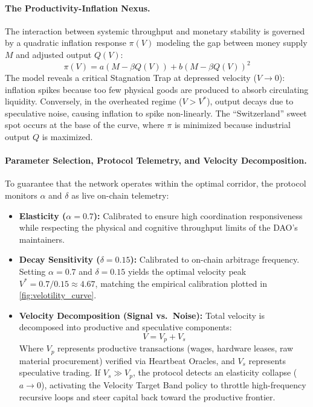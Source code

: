 \documentclass[a4paper,11pt,twoside,parskip=half-,headings=small]{scrartcl}
\begin{document}
\paragraph{The Productivity-Inflation Nexus.}
The interaction between systemic throughput and monetary stability is governed by a quadratic inflation response $\pi(V)$ modeling the gap between money supply $M$ and adjusted output $Q(V)$:
\begin{equation}
  \pi(V) = a \left( M - \beta Q(V) \right) + b \left( M - \beta Q(V) \right)^2
  \label{eq:inflation_nexus}
\end{equation}
The model reveals a critical Stagnation Trap at depressed velocity ($V \to 0$): inflation spikes because too few physical goods are produced to absorb circulating liquidity. Conversely, in the overheated regime ($V > V^*$), output decays due to speculative noise, causing inflation to spike non-linearly. The ``Switzerland'' sweet spot occurs at the base of the curve, where $\pi$ is minimized because industrial output $Q$ is maximized.

\paragraph{Parameter Selection, Protocol Telemetry, and Velocity Decomposition.}
To guarantee that the network operates within the optimal corridor, the protocol monitors $\alpha$ and $\delta$ as live on-chain telemetry:
\begin{itemize}[nosep]
  \item \textbf{Elasticity ($\alpha = 0.7$):} Calibrated to ensure high coordination responsiveness while respecting the physical and cognitive throughput limits of the DAO's maintainers.
  \item \textbf{Decay Sensitivity ($\delta = 0.15$):} Calibrated to on-chain arbitrage frequency. Setting $\alpha = 0.7$ and $\delta = 0.15$ yields the optimal velocity peak $V^* = 0.7 / 0.15 \approx 4.67$, matching the empirical calibration plotted in \cref{fig:velotility_curve}.
  \item \textbf{Velocity Decomposition (Signal vs.\ Noise):} Total velocity is decomposed into productive and speculative components:
  \begin{equation}
    V = V_p + V_s
  \end{equation}
  Where $V_p$ represents productive transactions (wages, hardware leases, raw material procurement) verified via Heartbeat Oracles, and $V_s$ represents speculative trading. If $V_s \gg V_p$, the protocol detects an elasticity collapse ($a \to 0$), activating the Velocity Target Band policy to throttle high-frequency recursive loops and steer capital back toward the productive frontier.
\end{itemize}
\end{document}
